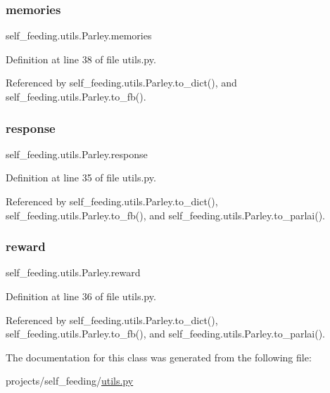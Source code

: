 \subsubsection{\texorpdfstring{memories}{memories}}
{\footnotesize\ttfamily self\+\_\+feeding.\+utils.\+Parley.\+memories}



Definition at line 38 of file utils.\+py.



Referenced by self\+\_\+feeding.\+utils.\+Parley.\+to\+\_\+dict(), and self\+\_\+feeding.\+utils.\+Parley.\+to\+\_\+fb().

\mbox{\label{classself__feeding_1_1utils_1_1Parley_aa1f1d6581b6aa107659005af86b69dad}} 
\subsubsection{\texorpdfstring{response}{response}}
{\footnotesize\ttfamily self\+\_\+feeding.\+utils.\+Parley.\+response}



Definition at line 35 of file utils.\+py.



Referenced by self\+\_\+feeding.\+utils.\+Parley.\+to\+\_\+dict(), self\+\_\+feeding.\+utils.\+Parley.\+to\+\_\+fb(), and self\+\_\+feeding.\+utils.\+Parley.\+to\+\_\+parlai().

\mbox{\label{classself__feeding_1_1utils_1_1Parley_a039021fbe9ced8e0053966cf48f1a32e}} 
\subsubsection{\texorpdfstring{reward}{reward}}
{\footnotesize\ttfamily self\+\_\+feeding.\+utils.\+Parley.\+reward}



Definition at line 36 of file utils.\+py.



Referenced by self\+\_\+feeding.\+utils.\+Parley.\+to\+\_\+dict(), self\+\_\+feeding.\+utils.\+Parley.\+to\+\_\+fb(), and self\+\_\+feeding.\+utils.\+Parley.\+to\+\_\+parlai().



The documentation for this class was generated from the following file\+:\begin{DoxyCompactItemize}
\item 
projects/self\+\_\+feeding/\hyperlink{projects_2self__feeding_2utils_8py}{utils.\+py}\end{DoxyCompactItemize}

